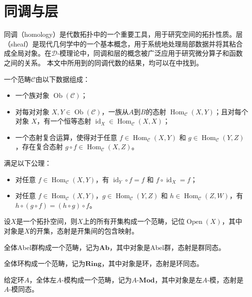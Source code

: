 \documentclass[12pt,a4paper]{ctexrep}   %
\begin{document}
\section{同调与层}
同调（homology）是代数拓扑中的一个重要工具，用于研究空间的拓扑性质。层（sheaf）是现代几何学中的一个基本概念，用于系统地处理局部数据并将其粘合成全局对象。在$\mathcal{D}$-模理论中，同调和层的概念被广泛应用于研究微分算子和函数之间的关系。
本文中所用到的同调代数的结果，均可以在\cite{陈志杰2024代数基础}中找到。
\begin{definition}
    一个范畴$\mathcal{C}$由以下数据组成：
    \begin{itemize}
        \item 一个族对象 $\operatorname{Ob}(\mathcal{C})$；
        \item 对每对对象 $X,Y\in \operatorname{Ob}(\mathcal{C})$，一族从$A$到$B$的态射 $\operatorname{Hom}_{\mathcal{C}}(X,Y)$；且对每个对象 $X$，有一个恒等态射 $\operatorname{id}_X\in \operatorname{Hom}_{\mathcal{C}}(X,X)$；
        \item 一个态射复合运算，使得对于任意 $f\in \operatorname{Hom}_{\mathcal{C}}(X,Y)$ 和 $g\in \operatorname{Hom}_{\mathcal{C}}(Y,Z)$，存在复合态射 $g\circ f\in \operatorname{Hom}_{\mathcal{C}}(X,Z)$。
    \end{itemize}
    满足以下公理：
    \begin{itemize}
        \item 对任意 $f\in \operatorname{Hom}_{\mathcal{C}}(X,Y)$，有 $\operatorname{id}_Y\circ f=f$ 和 $f\circ \operatorname{id}_X=f$；
        \item 对任意 $f\in \operatorname{Hom}_{\mathcal{C}}(X,Y)$，$g\in \operatorname{Hom}_{\mathcal{C}}(Y,Z)$ 和 $h\in \operatorname{Hom}_{\mathcal{C}}(Z,W)$，有 $h\circ (g\circ f)=(h\circ g)\circ f$。
    \end{itemize}
\end{definition}

\begin{example}
    设$X$是一个拓扑空间，则$X$上的所有开集构成一个范畴，记位$\operatorname{Open}(X)$，其中对象是$X$的开集，态射是开集间的包含映射。
\end{example}
\begin{example}
    全体Abel群构成一个范畴，记为$\mathbf{Ab}$，其中对象是Abel群，态射是群同态。
\end{example}
\begin{example}
    全体环构成一个范畴，记为$\mathbf{Ring}$，其中对象是环，态射是环同态。
\end{example}
\begin{example}
    给定环$A$，全体左$A$-模构成一个范畴，记为$A\text{-}\mathbf{Mod}$，其中对象是左$A$-模，态射是$A$-模同态。
\end{example}
\end{document}
